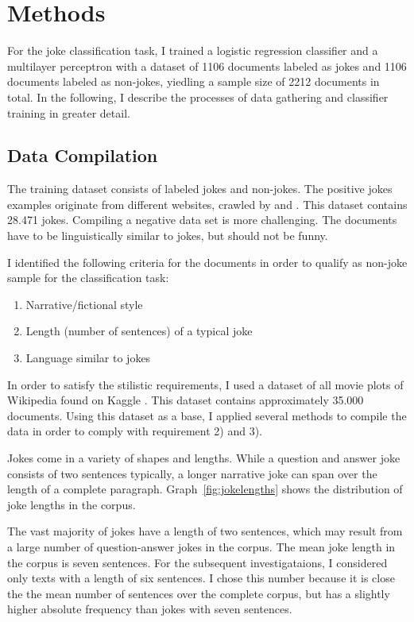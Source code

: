 \documentclass[12pt]{scrartcl}
\begin{document}
\section{Methods}
For the joke classification task, I trained a logistic regression classifier and a multilayer perceptron with a dataset of 1106 documents labeled as jokes and 1106 documents labeled as non-jokes, yiedling a sample size of 2212 documents in total.
In the following, I describe the processes of data gathering and classifier training in greater detail.

\subsection{Data Compilation}

The training dataset consists of labeled jokes and non-jokes. The positive jokes examples originate from different websites, crawled by \cite{pungasDatasetEnglishPlaintext2017} and \cite{moudgilPythonScriptsBuilding2017}. 
This dataset contains 28.471 jokes.
Compiling a negative data set is more challenging. The documents have to be linguistically similar to jokes, but should not be funny.

I identified the following criteria for the documents in order to qualify as non-joke sample for the classification task:
\begin{enumerate}
    \item Narrative/fictional style
    \item Length (number of sentences) of a typical joke
    \item Language similar to jokes
\end{enumerate}

In order to satisfy the stilistic requirements, I used a dataset of all movie plots of Wikipedia found on Kaggle \citep{revanthStoriesAmericanMovies2018}. 
This dataset contains approximately 35.000 documents.
Using this dataset as a base, I applied several methods to compile the data in order to comply with requirement 2) and 3). 

Jokes come in a variety of shapes and lengths.
While a question and answer joke consists of two sentences typically, a longer narrative joke can span over the length of a complete paragraph.
Graph~\ref{fig:jokelengths} shows the distribution of joke lengths in the corpus. 

The vast majority of jokes have a length of two sentences, which may result from a large number of question-answer jokes in the corpus.
The mean joke length in the corpus is seven sentences. 
For the subsequent investigataions, I considered only texts with a length of six sentences.
I chose this number because it is close the the mean number of sentences over the complete corpus, but has a slightly higher absolute frequency than jokes with seven sentences.
\end{document}
